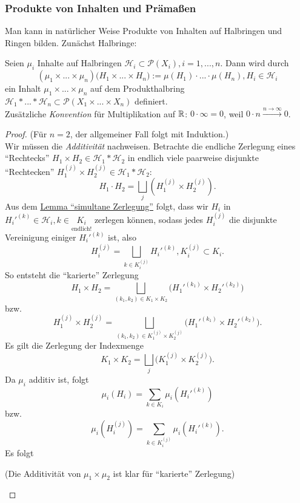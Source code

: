 \subsubsection{Produkte von Inhalten und Prämaßen}
Man kann in natürlicher Weise Produkte von Inhalten auf Halbringen und Ringen bilden. Zunächst Halbringe:
\begin{satz}
\begin{mdframed}
Seien $\mu_i$ Inhalte auf Halbringen $\mathcal{H}_i \subset \mathcal{P}(X_i), i=1,...,n$. Dann wird durch
$$
(\mu_1 \times ... \times \mu_n) \big(H_1 \times ... \times H_n \big) := \mu(H_1) \cdot ... \cdot \mu(H_n), H_i \in \mathcal{H}_i
$$
ein Inhalt $\mu_1 \times ... \times \mu_n$ auf dem Produkthalbring $\mathcal{H}_1 \ast ... \ast \mathcal{H}_n \subset \mathcal{P}(X_1 \times ... \times X_n)$ definiert. \\
Zusätzliche \emph{Konvention} für Multiplikation auf $\mathbb{R}$: $0 \cdot \infty = 0$, weil $ 0 \cdot n \xrightarrow{n \to \infty} 0$. 
\end{mdframed}
\begin{proof} (Für $n=2$, der allgemeiner Fall folgt mit Induktion.) \\
Wir müssen die \emph{Additivität} nachweisen. Betrachte die endliche Zerlegung eines ``Rechtecks'' $H_1 \times H_2 \in \mathcal{H}_1 \ast \mathcal{H}_2$ in endlich viele paarweise disjunkte ``Rechtecken'' $H_1^{(j)} \times H_2^{(j)} \in \mathcal{H}_1 \ast \mathcal{H}_2$:
$$
H_1 \cdot H_2 = \bigsqcup_{j} (H_1^{(j)} \times H_2^{(j)}).
$$
Aus dem \hyperref[lemmaA]{Lemma ``simultane Zerlegung''} folgt, dass wir $H_i$ in $H_i'^{(k)} \in \mathcal{H}_i, k \in \underset{\text{endlich!}}{K_i}$ zerlegen können, sodass jedes $H_i^{(j)}$  die disjunkte Vereinigung einiger $H_i'^{(k)}$ ist, also
$$
H_i^{(j)} = \bigsqcup_{k \in K_i^{(j)}} H_i'^{(k)}, K_i^{(j)}\subset K_i.
$$
So entsteht die ``karierte'' Zerlegung
$$
H_1 \times H_2 = \bigsqcup_{(k_1,k_2)\in K_1\times K_2} \Big (H_1'^{(k_1)} \times H_2'^{(k_2)} \Big)	
$$
bzw.
$$
H_1^{(j)} \times H_2^{(j)} = \bigsqcup_{(k_1,k_2)\in K_1^{(j)}\times K_2^{(j)}} \Big (H_1'^{(k_1)} \times H_2'^{(k_2)} \Big).
$$
Es gilt die Zerlegung der Indexmenge
$$
K_1 \times K_2 = \bigsqcup_j \Big( K_1^{(j)} \times K_2^{(j)} \Big).
$$
Da $\mu_i$ additiv ist, folgt
$$
\mu_i (H_i) = \sum_{k \in K_i} \mu_i (H_i'^{(k)})
$$
bzw. 
$$
\mu_i (H_i^{(j)}) = \sum_{k \in K_i^{(j)}} \mu_i (H_i'^{(k)}).
$$
Es folgt \begin{scriptsize}
(Die Additivität von $\mu_1 \times \mu_2$ ist klar für ``karierte'' Zerlegung)
\end{scriptsize}

\end{proof}
\end{satz}

